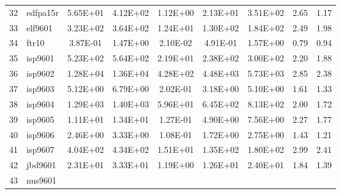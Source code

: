 \begin{landscape}
\begin{longtable}{@{}ll*{7}{S}@{}}
32 & edfpa15r  & 5.65E+01 & 4.12E+02 & 1.12E+00 & 2.13E+01 & 3.51E+02 & 2.65 & 1.17 \\
33 & elf9601   & 3.23E+02 & 3.64E+02 & 1.24E+01 & 1.30E+02 & 1.84E+02 & 2.49 & 1.98 \\
34 & ftr10     & 3.87E-01 & 1.47E+00 & 2.10E-02 & 4.91E-01 & 1.57E+00 & 0.79 & 0.94 \\
35 & isp9601   & 5.23E+02 & 5.64E+02 & 2.19E+01 & 2.38E+02 & 3.00E+02 & 2.20 & 1.88 \\
36 & isp9602   & 1.28E+04 & 1.36E+04 & 4.28E+02 & 4.48E+03 & 5.73E+03 & 2.85 & 2.38 \\
37 & isp9603   & 5.12E+00 & 6.79E+00 & 2.02E-01 & 3.18E+00 & 5.10E+00 & 1.61 & 1.33 \\
38 & isp9604   & 1.29E+03 & 1.40E+03 & 5.96E+01 & 6.45E+02 & 8.13E+02 & 2.00 & 1.72 \\
39 & isp9605   & 1.11E+01 & 1.34E+01 & 1.27E-01 & 4.90E+00 & 7.56E+00 & 2.27 & 1.77 \\
40 & isp9606   & 2.46E+00 & 3.33E+00 & 1.08E-01 & 1.72E+00 & 2.75E+00 & 1.43 & 1.21 \\
41 & isp9607   & 4.04E+02 & 4.34E+02 & 1.51E+01 & 1.35E+02 & 1.80E+02 & 2.99 & 2.41 \\
42 & jbd9601   & 2.31E+01 & 3.33E+01 & 1.19E+00 & 1.26E+01 & 2.40E+01 & 1.84 & 1.39 \\
43 & nus9601   &         &         &         &         &         &     &     \\* \bottomrule
\end{longtable}
\end{landscape}